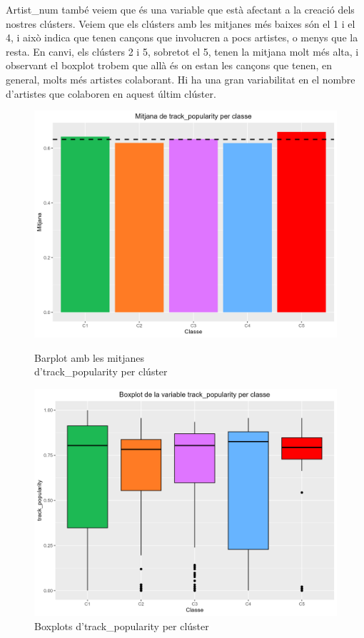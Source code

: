 Artist\_num també veiem que és una variable que està afectant a la creació dels nostres clústers. Veiem que els clústers amb les mitjanes més baixes són el 1 i el 4, i això indica que tenen cançons que involucren a pocs artistes, o menys que la resta. En canvi, els clústers 2 i 5, sobretot el 5, tenen la mitjana molt més alta, i observant el boxplot trobem que allà és on estan les cançons que tenen, en general, molts més artistes colaborant. Hi ha una gran variabilitat en el nombre d'artistes que colaboren en aquest últim clúster. 

\begin{figure}[H]
\centering
    \begin{minipage}{.49\textwidth}
        \centering
        \includegraphics[width=0.95\linewidth]{Images/5_Profiling/numeriques/Num_BarPlot_track_popularity.png}
        \caption{Barplot amb les mitjanes \\ d'track\_popularity per clúster}
        \label{fig:Num_BarPlot_track_popularity}
    \end{minipage}%
    \begin{minipage}{.49\textwidth}
        \centering
        \includegraphics[width=0.95\linewidth]{Images/5_Profiling/numeriques/Num_BoxPlot_track_popularity.png}
        \caption{Boxplots d'track\_popularity per clúster}
        \label{fig:Num_BoxPlot_track_popularity}
    \end{minipage}%
\end{figure}

